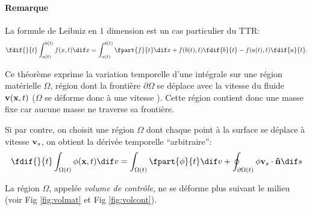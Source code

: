 \paragraph{Remarque} La formule de Leibniz en 1 dimension est un cas particulier du TTR:
\[ \fdif{}{t}\int_{a(t)}^{b(t)}f(x,t) \dif x =
\int_{a(t)}^{b(t)}\fpart{f}{t} \dif x + f(b(t),t)\fdif{b}{t} - f(a(t),t)\fdif{a}{t}. \]

Ce théorème exprime la variation temporelle d'une intégrale sur une région matérielle $\Omega$, région dont la frontière $\partial \Omega$ se déplace avec la vitesse du fluide $\textbf{v}(\textbf{x},t)$ ($\Omega$ se déforme donc à une vitesse ). Cette région contient donc une masse fixe car aucune masse ne traverse sa frontière.

Si par contre, on choisit une région $\Omega$ dont chaque point à la surface se déplace à vitesse $\textbf{v}_s$, on obtient la dérivée temporelle ``arbitraire'':
\begin{equation}
  \fdif{}{t}\int_{\Omega (t)}\phi(\fv{x},t) \dif v=\int_{\Omega (t)}\fpart{\phi}{t} \dif v + \oint_{\partial \Omega (t)}\phi\fv{v}_s\cdot \fv{\^n} \dif s
\end{equation}

La région $\Omega$, appelée \emph{volume de contrôle}, ne se déforme plus suivant le milieu (voir Fig \ref{fig:volmat} et Fig \ref{fig:volcont}).

